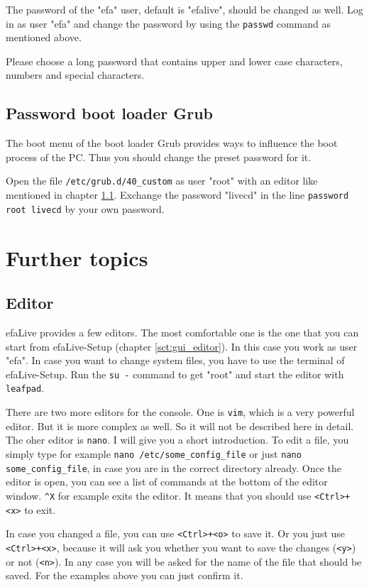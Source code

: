 \documentclass[a4paper,12pt,twoside]{article}
\begin{document}
The password of the "efa" user, default is "efalive", should be changed as well. 
Log in as user "efa" and change the password by using the \texttt{passwd} command
as mentioned above.

Please choose a long password that contains upper and lower case
characters, numbers and special characters.


\subsection{Password boot loader Grub}
\label{sct:password_grub}
The boot menu of the boot loader Grub \cite{GRB1} provides ways to
influence the boot process of the PC. Thus you should change the preset
password for it.

Open the file \texttt{/etc/grub.d/40\_custom} as user
"root" with an editor like mentioned in
chapter \ref{sct:editor}. Exchange the password "livecd"
in the line \texttt{password root livecd} by your
own password.


\section{Further topics}
\label{sct:further_topics}
\subsection{Editor}
\label{sct:editor}
efaLive provides a few editors. The
most comfortable one is the one that you can start from efaLive-Setup
(chapter \ref{sct:gui_editor}). In this case you work as user
"efa". In case you want to change system
files, you have to use the terminal of efaLive-Setup. Run the
\texttt{su -} command to get
"root" and start the editor with
\texttt{leafpad}. 

There are two more editors for the console. One is
\texttt{vim}, which is a very powerful editor. But
it is more complex as well. So it will not be described here in detail.
The oher editor is \texttt{nano}. I will give you
a short introduction. To edit a file, you simply type for example
\texttt{nano /etc/some\_config\_file} or
just \texttt{nano some\_config\_file}, in case you are
in the correct directory already. Once the editor is open, you can see
a list of commands at the bottom of the editor window.
\texttt{\^{}X} for example exits the editor. It
means that you should use
\texttt{{\textless}Ctrl{\textgreater}+{\textless}x{\textgreater}} to exit.

In case you changed a file, you can use
\texttt{{\textless}Ctrl{\textgreater}+{\textless}o{\textgreater}} to save it. Or
you just use \texttt{{\textless}Ctrl{\textgreater}+{\textless}x{\textgreater}},
because it will ask you whether you want to save the changes
(\texttt{{\textless}y{\textgreater}}) or not (\texttt{{\textless}n{\textgreater}}). In
any case you will be asked for the name of the file that should be
saved. For the examples above you can just confirm it.
\end{document}
